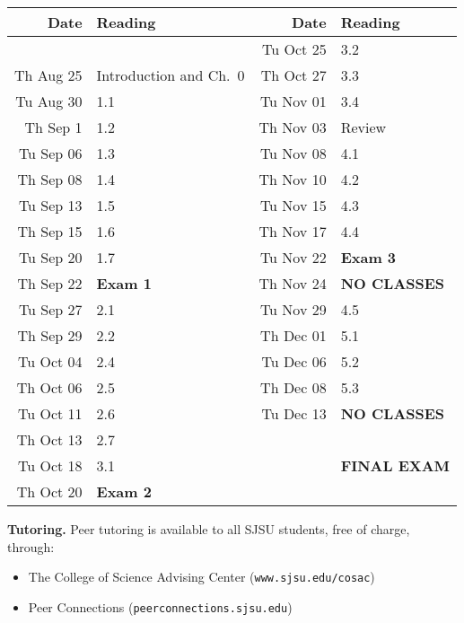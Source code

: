 \documentclass[letterpaper]{article}
\begin{document}
\begin{center}
\begin{tabular}{|r|p{1.5in}||r|p{1.5in}|}\hline
Date & Reading & Date & Reading \\ \hline
 &  & 
  Tu Oct 25 & 3.2 \\
Th Aug 25 & Introduction and Ch.\ 0 &
	Th Oct 27 & 3.3 \\ \hline
%
Tu Aug 30 & 1.1 &
	Tu Nov 01 & 3.4 \\
Th Sep 1 & 1.2 &
	Th Nov 03 & Review \\ \hline
%
Tu Sep 06 & 1.3 &
	Tu Nov 08 & 4.1 \\
Th Sep 08 & 1.4 &
	Th Nov 10 & 4.2 \\ \hline
%
Tu Sep 13 & 1.5 &
	Tu Nov 15 & 4.3 \\
Th Sep 15 & 1.6 &
	Th Nov 17 & 4.4 \\ \hline
%
Tu Sep 20 & 1.7 &
	Tu Nov 22 & {\bf Exam 3\/} \\
Th Sep 22 & {\bf Exam 1\/} &
	Th Nov 24 & {\bf NO CLASSES\/} \\ \hline
%
Tu Sep 27 & 2.1 &
	Tu Nov 29 & 4.5 \\
Th Sep 29 & 2.2 &
	Th Dec 01 & 5.1 \\ \hline
%
Tu Oct 04 & 2.4 &
	Tu Dec 06 & 5.2 \\
Th Oct 06 & 2.5 &
	Th Dec 08 & 5.3 \\ \hline
%
Tu Oct 11 & 2.6 &
  Tu Dec 13 & {\bf NO CLASSES\/}  \\
Th Oct 13 & 2.7 &
   &  \\ \hline
%
Tu Oct 18 & 3.1 &
	{\bf \finaldate\/} & {\bf FINAL EXAM} \\
Th Oct 20 & {\bf Exam 2\/} &
	& {\bf \finaltime\/} \\ \hline
\end{tabular}
\end{center}

{\bf Tutoring.\/} Peer tutoring is available to all SJSU
students, free of charge, through:
\begin{itemize}
\item The College of Science Advising Center ({\tt www.sjsu.edu/cosac\/})
\item Peer Connections ({\tt peerconnections.sjsu.edu\/})
\end{itemize}
\end{document}
